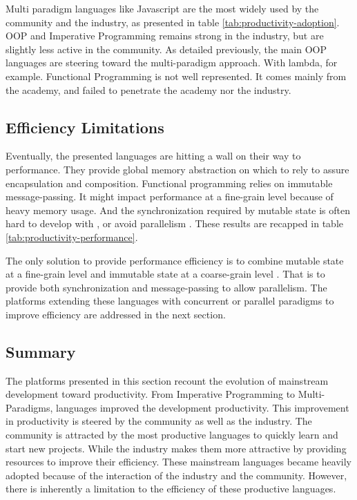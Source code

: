 \separator

Multi paradigm languages like Javascript are the most widely used by the community and the industry, as presented in table \ref{tab:productivity-adoption}.
OOP and Imperative Programming remains strong in the industry, but are slightly less active in the community.
As detailed previously, the main OOP languages are steering toward the multi-paradigm approach.
With lambda, for example.
Functional Programming is not well represented.
It comes mainly from the academy, and failed to penetrate the academy nor the industry.


\subsection{Efficiency Limitations} \label{chapter3:software-productivity:efficiency-limitations}

Eventually, the presented languages are hitting a wall on their way to performance.
They provide global memory abstraction on which to rely to assure encapsulation and composition. %
Functional programming relies on immutable message-passing.
It might impact performance at a fine-grain level because of heavy memory usage.
And the synchronization required by mutable state is often hard to develop with \cite{Adya2002}, or avoid parallelism \cite{Pai1999,Krohn2007}.
These results are recapped in table \ref{tab:productivity-performance}.


The only solution to provide performance efficiency is to combine mutable state at a fine-grain level and immutable state at a coarse-grain level .
That is to provide both synchronization and message-passing to allow parallelism.
The platforms extending these languages with concurrent or parallel paradigms to improve efficiency are addressed in the next section.

\subsection{Summary} \label{chapter3:software-productivity:summary}

The platforms presented in this section recount the evolution of mainstream development toward productivity.
From Imperative Programming to Multi-Paradigms, languages improved the development productivity.
This improvement in productivity is steered by the community as well as the industry.
The community is attracted by the most productive languages to quickly learn and start new projects.
While the industry makes them more attractive by providing resources to improve their efficiency.
These mainstream languages became heavily adopted because of the interaction of the industry and the community.
However, there is inherently a limitation to the efficiency of these productive languages.

